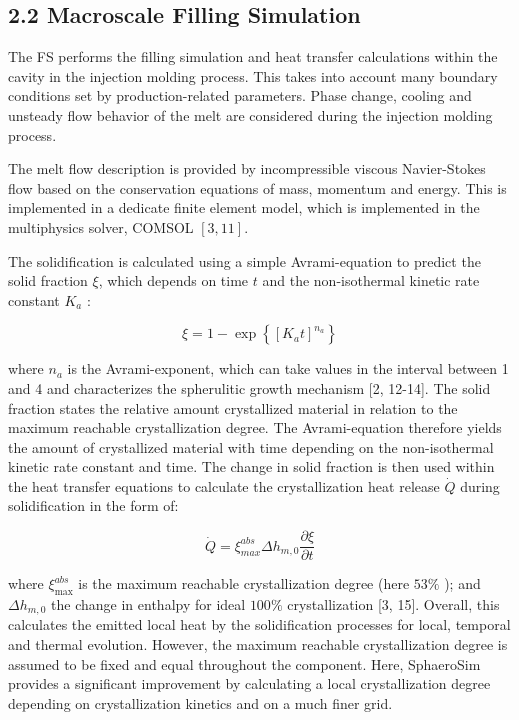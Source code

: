 \documentclass[10pt]{article}
\begin{document}
\subsection*{2.2 Macroscale Filling Simulation}
The FS performs the filling simulation and heat transfer calculations within the cavity in the injection molding process. This takes into account many boundary conditions set by production-related parameters. Phase change, cooling and unsteady flow behavior of the melt are considered during the injection molding process.

The melt flow description is provided by incompressible viscous Navier-Stokes flow based on the conservation equations of mass, momentum and energy. This is implemented in a dedicate finite element model, which is implemented in the multiphysics solver, COMSOL $[3,11]$.

The solidification is calculated using a simple Avrami-equation to predict the solid fraction $\xi$, which depends on time $t$ and the non-isothermal kinetic rate constant $K_{a}$ :


\begin{equation*}
\xi=1-\exp \left\{\left[K_{a} t\right]^{n_{a}}\right\} \tag{1}
\end{equation*}


where $n_{a}$ is the Avrami-exponent, which can take values in the interval between 1 and 4 and characterizes the spherulitic growth mechanism [2, 12-14]. The solid fraction states the relative amount crystallized material in relation to the maximum reachable crystallization degree. The Avrami-equation therefore yields the amount of crystallized material with time depending on the non-isothermal kinetic rate constant and time. The change in solid fraction is then used within the heat transfer equations to calculate the crystallization heat release $\dot{Q}$ during solidification in the form of:


\begin{equation*}
\dot{Q}=\xi_{m a x}^{a b s} \Delta h_{m, 0} \frac{\partial \xi}{\partial t} \tag{2}
\end{equation*}


where $\xi_{\max }^{a b s}$ is the maximum reachable crystallization degree (here $53 \%$ ); and $\Delta h_{m, 0}$ the change in enthalpy for ideal $100 \%$ crystallization [3, 15]. Overall, this calculates the emitted local heat by the solidification processes for local, temporal and thermal evolution. However, the maximum reachable crystallization degree is assumed to be fixed and equal throughout the component. Here, SphaeroSim provides a significant improvement by calculating a local crystallization degree depending on crystallization kinetics and on a much finer grid.
\end{document}
